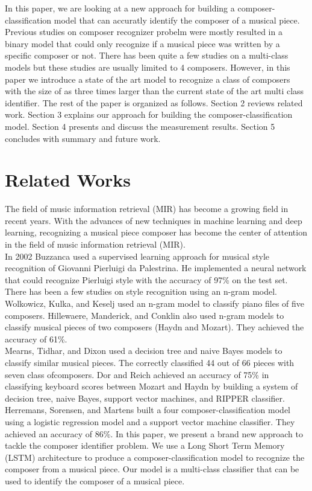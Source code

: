 \documentclass[11pt,a4paper]{article}
\begin{document}
In this paper, we are looking at a new approach for building a composer-classification model that can accuratly identify the composer of a musical piece. Previous studies on composer recognizer probelm were mostly resulted in a binary model that could only recognize if a musical piece was written by a specific composer or not. There has been quite a few studies on a multi-class models but these studies are usually limited to 4 composers.  However, in this paper we introduce a state of the art model to recognize a class of composers with the size of as three times larger than the current state of the art multi class identifier. The rest of the paper is organized as follows. Section 2 reviews related work. Section 3 explains our approach for building the composer-classification model. Section 4 presents and discuss the measurement results. Section 5 concludes with summary and future work.


\section{Related Works}

The field of music information retrieval (MIR) has become a growing field in recent years. 
With the advances of new techniques in machine learning and deep learning, recognizing a musical piece composer has become  the center of attention in the field of music information retrieval (MIR).\\
In 2002 Buzzanca \cite{Buzz} used a supervised learning approach for musical style recognition of Giovanni Pierluigi da Palestrina. He implemented a neural network that could recognize Pierluigi style with the accuracy of 97\% on the test set. \\
There has been a few studies on style recognition using an n-gram model. Wolkowicz, Kulka, and Keselj \cite{n-gram} used an n-gram model to classify piano files of five composers.  Hillewaere, Manderick, and Conklin \cite{Hillewaere} also used n-gram models to classify musical pieces of two composers (Haydn and Mozart). They achieved the accuracy of 61\%.\\ 
Mearns, Tidhar, and Dixon \cite{Mearns} used a decision tree and naive Bayes models to classify similar musical pieces. The correctly classified 44 out of 66 pieces with seven class ofcomposers. Dor and Reich \cite{Dor} achieved an accuracy of 75\% in classifying keyboard scores between Mozart and Haydn by building a system of decision tree, naive Bayes, support vector machines, and RIPPER classifier. \\
Herremans, Sorensen, and Martens \cite {Herremans} built a four composer-classification model using a logistic regression model and a support vector machine classifier. They achieved an accuracy of 86\%. 
In this paper, we present a brand new approach to tackle the composer identifier problem. We use a Long Short Term Memory (LSTM) architecture to produce a composer-classification model to recognize the composer from a musical piece. Our model is a multi-class classifier that can be used to identify the composer of a musical piece. 
\end{document}
